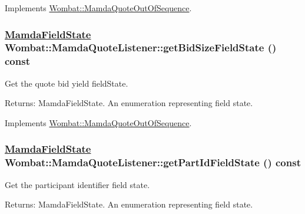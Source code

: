 Implements \hyperlink{classWombat_1_1MamdaQuoteOutOfSequence_0c70e9a4b5c452a8f22d79f3faf67cf7}{Wombat::Mamda\-Quote\-Out\-Of\-Sequence}.\hypertarget{classWombat_1_1MamdaQuoteListener_00ecbc2964d5439e77d04ffc2d00d9e9}{
\subsubsection[getBidSizeFieldState]{\setlength{\rightskip}{0pt plus 5cm}\hyperlink{namespaceWombat_93aac974f2ab713554fd12a1fa3b7d2a}{Mamda\-Field\-State} Wombat::Mamda\-Quote\-Listener::get\-Bid\-Size\-Field\-State () const}}
\label{classWombat_1_1MamdaQuoteListener_00ecbc2964d5439e77d04ffc2d00d9e9}


Get the quote bid yield field\-State. 

\begin{Desc}
\item[Returns:]Mamda\-Field\-State. An enumeration representing field state. \end{Desc}


Implements \hyperlink{classWombat_1_1MamdaQuoteOutOfSequence_349931c22f5522b07b991efc90c06140}{Wombat::Mamda\-Quote\-Out\-Of\-Sequence}.\hypertarget{classWombat_1_1MamdaQuoteListener_f9ff48ba9ea68b551b07e18ebef77a51}{
\subsubsection[getPartIdFieldState]{\setlength{\rightskip}{0pt plus 5cm}\hyperlink{namespaceWombat_93aac974f2ab713554fd12a1fa3b7d2a}{Mamda\-Field\-State} Wombat::Mamda\-Quote\-Listener::get\-Part\-Id\-Field\-State () const}}
\label{classWombat_1_1MamdaQuoteListener_f9ff48ba9ea68b551b07e18ebef77a51}


Get the participant identifier field state. 

\begin{Desc}
\item[Returns:]Mamda\-Field\-State. An enumeration representing field state. \end{Desc}


